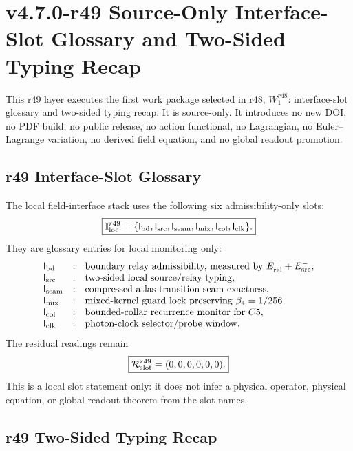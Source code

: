 \section{v4.7.0-r49 Source-Only Interface-Slot Glossary and Two-Sided Typing Recap}
\label{sec:v470-r49-interface-slot-glossary-typing-recap}

This r49 layer executes the first work package selected in r48,
\(W_1^{r48}\): interface-slot glossary and two-sided typing recap.  It is
source-only.  It introduces no new DOI, no PDF build, no public release, no
action functional, no Lagrangian, no Euler--Lagrange variation, no derived field
equation, and no global readout promotion.

\subsection{r49 Interface-Slot Glossary}
\label{subsec:r49-interface-slot-glossary}

The local field-interface stack uses the following six admissibility-only slots:
\[
\boxed{
\mathbb I_{\rm loc}^{r49}
=
\{\mathsf I_{\rm bd},\mathsf I_{\rm src},\mathsf I_{\rm seam},
\mathsf I_{\rm mix},\mathsf I_{\rm col},\mathsf I_{\rm clk}\}.
}
\]
They are glossary entries for local monitoring only:
\[
\begin{array}{lll}
\mathsf{I_{\rm bd}} &:& \text{boundary relay admissibility, measured by }E_{\rm rel}^{-}+E_{\rm src}^{-},\\
\mathsf{I_{\rm src}} &:& \text{two-sided local source/relay typing},\\
\mathsf{I_{\rm seam}} &:& \text{compressed-atlas transition seam exactness},\\
\mathsf{I_{\rm mix}} &:& \text{mixed-kernel guard lock preserving }\beta_4=1/256,\\
\mathsf{I_{\rm col}} &:& \text{bounded-collar recurrence monitor for }C5,\\
\mathsf{I_{\rm clk}} &:& \text{photon-clock selector/probe window.}
\end{array}
\]
The residual readings remain
\[
\boxed{
\mathcal R_{\rm slot}^{r49}=(0,0,0,0,0,0).
}
\]
This is a local slot statement only: it does not infer a physical operator,
physical equation, or global readout theorem from the slot names.

\subsection{r49 Two-Sided Typing Recap}
\label{subsec:r49-two-sided-typing-recap}

